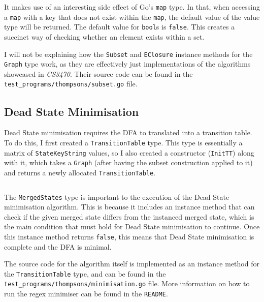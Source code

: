 It makes use of an interesting side effect of Go's \texttt{map} type. In that, when accessing a \texttt{map} with a key that does not exist within the \texttt{map}, the default value of the value type will be returned. The default value for \texttt{bool}s is \texttt{false}. This creates a succinct way of checking whether an element exists within a set.

I will not be explaining how the \verb|Subset| and \verb|EClosure| instance methods for the \verb|Graph| type work, as they are effectively just implementations of the algorithms showcased in \textit{CS3470}. Their source code can be found in the \verb|test_programs/thompsons/subset.go| file.

\subsection{Dead State Minimisation}

Dead State minimisation requires the DFA to translated into a transition table. To do this, I first created a \verb|TransitionTable| type. This type is essentially a matrix of \verb|StateKeyString| values, so I also created a constructor (\verb|InitTT|) along with it, which takes a \verb|Graph| (after having the subset construction applied to it) and returns a newly allocated \verb|TransitionTable|.

\inputminted[firstline=45, lastline=46, autogobble, breaklines, tabsize=4, ]{go}{../../test_programs/thompsons/minimisation.go}

The \verb|MergedStates| type is important to the execution of the Dead State minimisation algorithm. This is because it includes an instance method that can check if the given merged state differs from the instanced merged state, which is the main condition that must hold for Dead State minimisation to continue. Once this instance method returns \texttt{false}, this means that Dead State minimisation is complete and the DFA is minimal.

The source code for the algorithm itself is implemented as an instance method for the \verb|TransitionTable| type, and can be found in the \verb|test_programs/thompsons/minimisation.go| file. More information on how to run the regex minimiser can be found in the \verb|README|.
